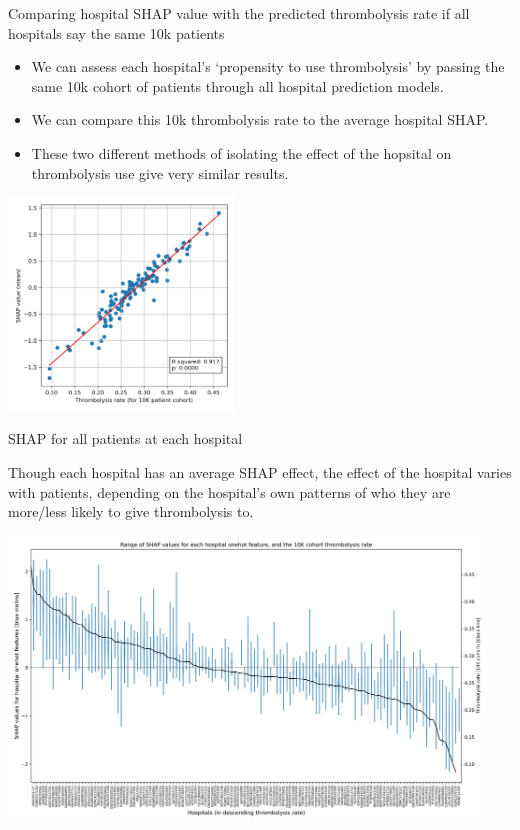 \documentclass[xcolor={usenames,dvipsnames}]{beamer}
\begin{document}
\begin{frame}{Comparing hospital SHAP value with the predicted thrombolysis rate if all hospitals say the same 10k patients}

\footnotesize

\begin{itemize}
    \item We can assess each hospital’s ‘propensity to use thrombolysis’ by passing the same 10k cohort of patients through all hospital prediction models.
    \item We can compare this 10k thrombolysis rate to the average hospital SHAP.
    \item These two different methods of isolating the effect of the hopsital on thrombolysis use give very similar results.
\end{itemize}

\begin{center}
    \includegraphics[width=0.45\textwidth]{./images/shap_vs_10k.jpg}
\end{center}

    
\end{frame}

\begin{frame}{SHAP for all patients at each hospital}
    
Though each hospital has an average SHAP effect, the effect of the hospital varies with patients, depending on the hospital's own patterns of who they are more/less likely to give thrombolysis to.

\begin{center}
    \includegraphics[width=0.95\textwidth]{./images/hospital_feature_shap_violin}
\end{center}     

 
\end{frame}
\end{document}

